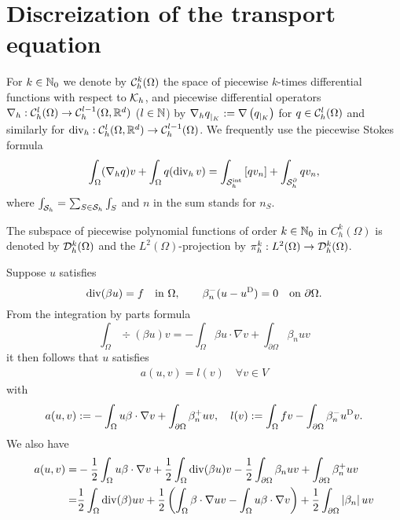 %
\section{Discreization of the transport equation}\label{sec:}
%
For $k\in\mathbb N_0$ we denote by $\mathcal{C}_h^k(\Omega)$ the space of piecewise $k$-times differential functions with respect to $\mathcal K_h$, and 
piecewise differential operators $\nabla_h:\mathcal{C}_h^l(\Omega)\to \mathcal{C}_h^{l-1}(\Omega,\mathbb R^d)$ ($l\in\mathbb N$) by 
${\nabla_h q}_{|_{K}} := \nabla\left({q}_{|_{K}}\right)$ for $q\in \mathcal{C}_h^l(\Omega)$ and similarly for 
$\operatorname{div}_h: \mathcal{C}_h^{l}(\Omega,\mathbb R^d)\to \mathcal{C}_h^{l-1}(\Omega)$.
We frequently use the piecewise Stokes formula
%
\begin{equation}\label{eq:StokesPiecewise}
\int_{\Omega} (\nabla_h q) v + \int_{\Omega} q (\operatorname{div}_h v) = \int_{\mathcal S^{\rm int}_h}\left[q v_n\right] +  \int_{\mathcal S^{\partial}_h}q v_n,
\end{equation}
%
where $\int_{\mathcal S_h}=\sum_{S\in\mathcal S_h}\int_S$ and $n$ in the sum stands for $n_S$.

The subspace of piecewise polynomial functions of order $k\in\mathbb N_0$ in $C^k_h(\Omega)$ is denoted by $\mathcal{D}_h^k(\Omega)$ and the $L^2(\Omega)$-projection by $\pi_h^k:L^2(\Omega)\to\mathcal{D}_h^k(\Omega)$.


Suppose $u$ satisfies
%
\begin{equation}\label{eq:transport}
\operatorname{div}(\beta u) = f\quad\mbox{in $\Omega$},\qquad \beta_n^{-}(u-u^{\rm D}) = 0\quad \mbox{on $\partial\Omega$}.
\end{equation}
%
From the integration by parts formula
%
\begin{equation}\label{eq:}
\int_{\Omega}\div(\beta u ) v  = - \int_{\Omega}\beta u \cdot \nabla v + \int_{\partial\Omega} \beta_n uv
\end{equation}
%
it then follows that $u$ satisfies 
%
\begin{align*}
a(u,v)=l(v)\quad \forall v\in V
\end{align*}
%
with
%
\begin{equation}\label{eq:}
a(u,v) := -\int_{\Omega} u \beta\cdot \nabla v + \int_{\partial\Omega} \beta_n^+ uv,\quad l(v) := \int_{\Omega} fv -\int_{\partial\Omega} \beta_n^- u^{\rm D} v.
\end{equation}
%
We also have
%
\begin{align*}
a(u,v) =& -\frac12\int_{\Omega} u  \beta\cdot\nabla v + \frac12 \int_{\Omega}\operatorname{div}(\beta u ) v - \frac12 \int_{\partial\Omega} \beta_n uv +\int_{\partial\Omega}\beta_n^+ uv\\
=&  \frac12 \int_{\Omega}\operatorname{div}(\beta) u  v +\frac12\left(\int_{\Omega} \beta\cdot\nabla u v-\int_{\Omega} u  \beta\cdot\nabla v\right)
+ \frac12 \int_{\partial\Omega}\left|\beta_n\right|uv
\end{align*}
%

